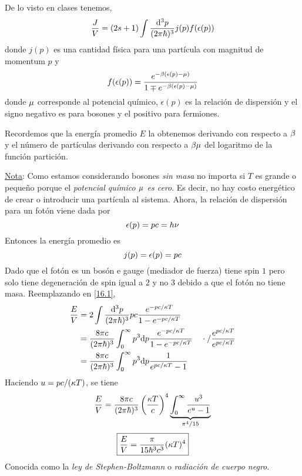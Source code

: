 \begin{sol}
	De lo visto en clases tenemos,
\begin{equation}\label{16.1}
  \frac{J}{V}=(2s+1)\int\frac{\dd^3p}{(2\pi\hbar)^3}j(p)f(\epsilon(p))
\end{equation}
donde $j(p)$ es una cantidad física para una partícula con magnitud de momentum $p$ y 
\begin{equation}
  f(\epsilon(p))=\frac{e^{-\beta (\epsilon(p)-\mu )}}{1\mp e^{-\beta (\epsilon(p)-\mu )}}
\end{equation}
donde $\mu$ corresponde al potencial químico, $\epsilon(p)$ es la relación de dispersión y el signo negativo es para bosones y el positivo para fermiones.

Recordemos que la energía promedio $E$ la obtenemos derivando con respecto a $\beta$ y el número de partículas derivando con respecto a $\beta\mu$ del logaritmo de la función partición.

\underline{Nota}: Como estamos considerando bosones \textit{sin masa} no importa si $T$ es grande o pequeño porque el \textit{potencial químico $\mu$ es cero}. Es decir, no hay costo energético de crear o introducir una partícula al sistema. Ahora, la relación de dispersión para un fotón viene dada por
\begin{equation}
  \epsilon(p)=pc=h\nu 
\end{equation}
Entonces la energía promedio es
\begin{equation}
  j(p)=\epsilon (p)=pc
\end{equation}
Dado que el fotón es un bosón e gauge (mediador de fuerza) tiene spin $1$ pero solo tiene degeneración de spin igual a $2$ y no $3$ debido a que el fotón no tiene masa. Reemplazando en \eqref{16.1},
\begin{align}
  \frac{E}{V}&=2\int\frac{\dd^3p}{(2\pi\hbar)^3}pc\frac{e^{-pc/\kappa T}}{1-e^{-pc/\kappa T}}\\
  &=\frac{8\pi c}{(2\pi\hbar)^3}\int_0^\infty p^3\dd p\frac{e^{-pc/\kappa T}}{1-e^{-pc/\kappa T}}\quad \cdot /\frac{e^{pc/\kappa T}}{e^{pc/\kappa T}}\\
  &=\frac{8\pi c}{(2\pi\hbar)^3}\int_0^\infty p^3\dd p \frac{1}{e^{pc/\kappa T}-1}
\end{align}
Haciendo $u=pc/(\kappa T)$, se tiene
\begin{align}
   \frac{E}{V}=\frac{8\pi c}{(2\pi\hbar)^3}\left(\frac{\kappa T}{c}\right)^4\underbrace{\int_0^\infty \frac{u^3}{e^{u}-1}}_{\pi^4/15}
\end{align}
\begin{equation}
\boxed{  \frac{E}{V}=\frac{\pi }{15\hbar^3c^3}(\kappa T)^4}
\end{equation}
Conocida como la \textit{ley de Stephen-Boltzmann} o \textit{radiación de cuerpo negro}.


\end{sol}
